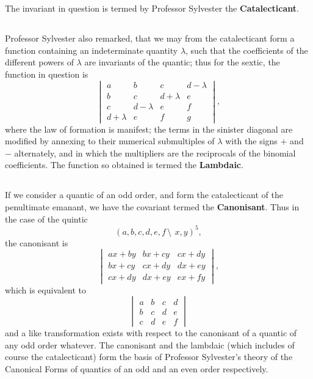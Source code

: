 \documentclass[11pt,a4paper]{book}
\begin{document}
\begin{center}
The invariant in question is termed by Professor Sylvester the \textbf{Catalecticant}.

\subsection{}

Professor Sylvester also remarked, that we may from the catalecticant form a function containing an indeterminate quantity $\lambda$, such that the coefficients of the different powers of $\lambda$ are invariants of the quantic; thus for the sextic, the function in question is
\[
\begin{vmatrix}
a & b & c & d - \lambda \\
b & c & d + \lambda & e \\
c & d - \lambda & e & f \\
d + \lambda & e & f & g
\end{vmatrix},
\]
where the law of formation is manifest; the terms in the sinister diagonal are modified by annexing to their numerical submultiples of $\lambda$ with the signs $+$ and $-$ alternately, and in which the multipliers are the reciprocals of the binomial coefficients. The function so obtained is termed the \textbf{Lambdaic}.

\subsection{}

If we consider a quantic of an odd order, and form the catalecticant of the penultimate emanant, we have the covariant termed the \textbf{Canonisant}. Thus in the case of the quintic
\[
(a, b, c, d, e, f\,\setminus\!\!\:\, x, y)^5,
\]
the canonisant is
\[
\begin{vmatrix}
ax + by & bx + cy & cx + dy \\
bx + cy & cx + dy & dx + ey \\
cx + dy & dx + ey & ex + fy
\end{vmatrix},
\]
which is equivalent to
\[
\begin{vmatrix}
a & b & c & d \\
b & c & d & e \\
c & d & e & f
\end{vmatrix}
\]
and a like transformation exists with respect to the canonisant of a quantic of any odd order whatever. The canonisant and the lambdaic (which includes of course the catalecticant) form the basis of Professor Sylvester's theory of the Canonical Forms of quantics of an odd and an even order respectively.


\end{center}
\end{document}
